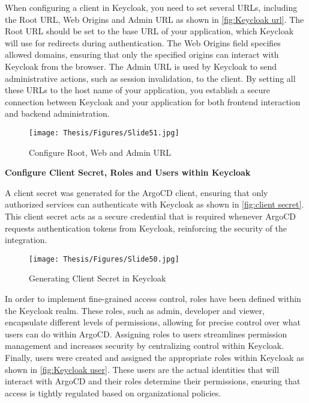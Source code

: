 When configuring a client in Keycloak, you need to set several URLs, including the Root URL, Web Origins and Admin URL as shown in \autoref{fig:Keycloak url}. The Root URL should be set to the base URL of your application, which Keycloak will use for redirects during authentication. The Web Origins field specifies allowed domains, ensuring that only the specified origins can interact with Keycloak from the browser. The Admin URL is used by Keycloak to send administrative actions, such as session invalidation, to the client. By setting all these URLs to the host name of your application, you establish a secure connection between Keycloak and your application for both frontend interaction and backend administration. \cite{keycloak_doc}

\begin{figure}[h]
\centering
\texttt{[image: Thesis/Figures/Slide51.jpg]}
\caption{\label{fig:Keycloak url}Configure Root, Web and Admin URL}
\end{figure}

\textbf{Configure Client Secret, Roles and Users within Keycloak}

A client secret was generated for the ArgoCD client, ensuring that only authorized services can authenticate with Keycloak as shown in \autoref{fig:client secret}. This client secret acts as a secure credential that is required whenever ArgoCD requests authentication tokens from Keycloak, reinforcing the security of the integration. \cite{keycloak_doc}

\begin{figure}[h]
\centering
\texttt{[image: Thesis/Figures/Slide50.jpg]}
\caption{\label{fig:client secret}Generating Client Secret in Keycloak}
\end{figure}

In order to implement fine-grained access control, roles have been defined within the Keycloak realm. These roles, such as admin, developer and viewer, encapsulate different levels of permissions, allowing for precise control over what users can do within ArgoCD. Assigning roles to users streamlines permission management and increases security by centralizing control within Keycloak. Finally, users were created and assigned the appropriate roles within Keycloak as shown in \autoref{fig:Keycloak user}. These users are the actual identities that will interact with ArgoCD and their roles determine their permissions, ensuring that access is tightly regulated based on organizational policies. \cite{keycloak_doc}


